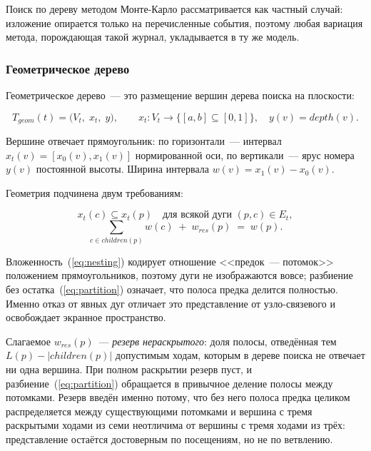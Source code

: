 Поиск по дереву методом Монте-Карло рассматривается как частный случай:
изложение опирается только на перечисленные события, поэтому любая
вариация метода, порождающая такой журнал, укладывается в ту же модель.

\subsubsection{Геометрическое дерево}

Геометрическое дерево~--- это размещение вершин дерева поиска на плоскости:

\begin{equation}
T_{geom}(t) = \bigl( V_t,\; x_t,\; y \bigr), \qquad
x_t\colon V_t \to \{[a, b] \subseteq [0, 1]\}, \quad y(v) = depth(v).
\end{equation}

Вершине отвечает прямоугольник: по горизонтали~--- интервал $x_t(v) = [x_0(v),
x_1(v)]$ нормированной оси, по вертикали~--- ярус номера $y(v)$ постоянной
высоты. Ширина интервала $w(v) = x_1(v) - x_0(v)$.

Геометрия подчинена двум требованиям:

\begin{equation}
x_t(c) \subseteq x_t(p) \quad \text{для всякой дуги } (p, c) \in E_t,
\label{eq:nesting}
\end{equation}
\begin{equation}
\sum_{c \in children(p)} w(c) \;+\; w_{res}(p) \;=\; w(p).
\label{eq:partition}
\end{equation}

Вложенность~(\ref{eq:nesting}) кодирует отношение <<предок~--- потомок>>
положением прямоугольников, поэтому дуги не изображаются вовсе; разбиение
без остатка~(\ref{eq:partition}) означает, что полоса предка делится
полностью. Именно отказ от явных дуг отличает это представление от
узло-связевого и освобождает экранное пространство.

Слагаемое $w_{res}(p)$~--- \emph{резерв нераскрытого}: доля полосы,
отведённая тем $L(p) - |children(p)|$ допустимым ходам, которым в дереве
поиска не отвечает ни одна вершина. При полном раскрытии резерв пуст, и
разбиение~(\ref{eq:partition}) обращается в привычное деление полосы между
потомками. Резерв введён именно потому, что без него полоса предка
целиком распределяется между существующими потомками и вершина с тремя
раскрытыми ходами из семи неотличима от вершины с тремя ходами из трёх:
представление остаётся достоверным по посещениям, но не по ветвлению.

